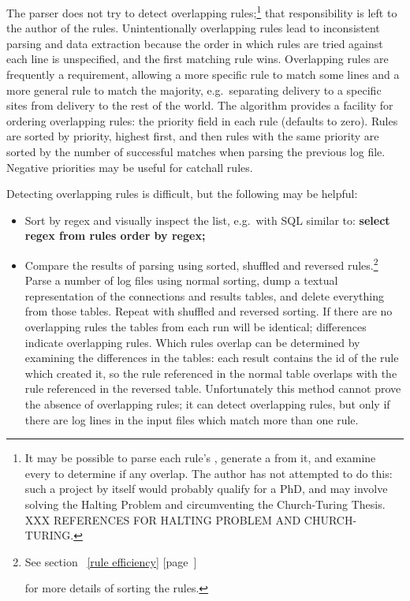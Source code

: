\documentclass[a4paper,12pt,draft]{article}
\newcommand{\refwithpage}[1]{%
    \empty{}\ref{#1} [page~\pageref{#1}]%
}
\begin{document}
The parser does not try to detect overlapping rules;\footnote{It may be
possible to parse each rule's \regex{}, generate a \DFA{} from it, and
examine every \DFA{} to determine if any overlap.  The author has not
attempted to do this: such a project by itself would probably qualify for a
PhD, and may involve solving the Halting Problem and circumventing the
Church-Turing Thesis.  XXX REFERENCES FOR HALTING PROBLEM AND
CHURCH-TURING\@.} that responsibility is left to the author of the rules.
Unintentionally overlapping rules lead to inconsistent parsing and data
extraction because the order in which rules are tried against each line is
unspecified, and the first matching rule wins.  Overlapping rules are
frequently a requirement, allowing a more specific rule to match some lines
and a more general rule to match the majority, e.g.\ separating \SMTP{}
delivery to a specific sites from \SMTP{} delivery to the rest of the
world.  The algorithm provides a facility for ordering overlapping rules:
the priority field in each rule (defaults to zero).  Rules are sorted by
priority, highest first, and then rules with the same priority are sorted
by the number of successful matches when parsing the previous log file.
Negative priorities may be useful for catchall rules.

Detecting overlapping rules is difficult, but the following may be helpful:

\begin{itemize}

    \item Sort by regex and visually inspect the list, e.g.\ with SQL
        similar to: \textbf{select regex from rules order by regex;}

    \item Compare the results of parsing using sorted, shuffled and
        reversed rules.\footnote{See section~\refwithpage{rule efficiency}
        for more details of sorting the rules.}  Parse a number of log
        files using normal sorting, dump a textual representation of the
        connections and results tables, and delete everything from those
        tables.  Repeat with shuffled and reversed sorting.  If there are
        no overlapping rules the tables from each run will be identical;
        differences indicate overlapping rules.  Which rules overlap can be
        determined by examining the differences in the tables: each result
        contains the id of the rule which created it, so the rule
        referenced in the normal table overlaps with the rule referenced in
        the reversed table.  Unfortunately this method cannot prove the
        absence of overlapping rules; it can detect overlapping rules, but
        only if there are log lines in the input files which match more
        than one rule.

\end{itemize}
\end{document}
